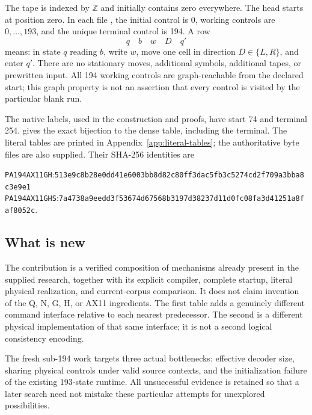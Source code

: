 \documentclass[10pt,a4paper]{article}
\newcommand{\GH}{\texttt{PA194AX11GH}}
\newcommand{\GHS}{\texttt{PA194AX11GHS}}
\begin{document}
The tape is indexed by $\mathbb Z$ and initially contains zero everywhere.
The head starts at position zero. In each file , the
initial control is 0, working controls are $0,\ldots,193$, and the unique
terminal control is 194. A row
\[
                         q\quad b\quad w\quad D\quad q'
\]
means: in state $q$ reading $b$, write $w$, move one cell in direction
$D\in\{L,R\}$, and enter $q'$. There are no stationary moves,
additional symbols, additional tapes, or prewritten input. All 194
working controls are graph-reachable from the declared start; this
graph property is not an assertion that every control is visited by
the particular blank run.

The native labels, used in the construction and proofs, have start 74
and terminal 254.  gives the exact bijection to the
dense table, including the terminal. The literal tables are printed
in Appendix~\ref{app:literal-tables}; the authoritative byte files are
also supplied. Their SHA-256 identities are
\begin{center}\small
\GH:\quad\nolinkurl{513e9c8b28e0dd41e6003bb8d82c80ff3dac5fb3c5274cd2f709a3bba8c3e9e1}\\[4pt]
\GHS:\quad\nolinkurl{7a4738a9eedd3f53674d67568b3197d38237d11d0fc08fa3d41251a8faf8052c}.
\end{center}

\subsection{What is new}

The contribution is a verified composition of mechanisms already present
in the supplied research, together with its explicit compiler, complete
startup, literal physical realization, and current-corpus comparison.
It does not claim invention of the Q, N, G, H, or AX11 ingredients.
The first table adds a genuinely different command interface relative
to each nearest predecessor. The second is a different physical
implementation of that same interface; it is not a second logical
consistency encoding.

The fresh sub-194 work targets three actual bottlenecks: effective
decoder size, sharing physical controls under valid source contexts,
and the initialization failure of the existing 193-state runtime.
All unsuccessful evidence is retained so that a later search need
not mistake these particular attempts for unexplored possibilities.


\end{document}
